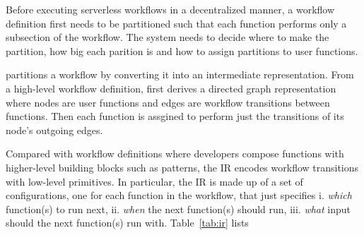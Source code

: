


Before executing serverless workflows in a decentralized manner, a workflow
definition first needs to be partitioned such that each function performs only
a subsection of the workflow. The system needs to decide where to make the
partition, how big each parition is and how to assign partitions to user
functions.

\name{} partitions a workflow by converting it into an intermediate
representation. From a high-level workflow definition, \name{} first derives a
directed graph representation where nodes are user functions and edges are
workflow transitions between functions. Then each function is assgined to
perform just the transitions of its node's outgoing edges.

Compared with workflow definitions where developers compose functions with
higher-level building blocks such as patterns, the \name{} IR encodes workflow
transitions with low-level primitives. In particular, the IR is made up of a
set of configurations, one for each function in the workflow, that just
specifies i. \textit{which} function(s) to run next, ii. \textit{when} the
next function(s) should run, iii. \textit{what} input should the next
function(s) run with. Table~\ref{tab:ir} lists 

